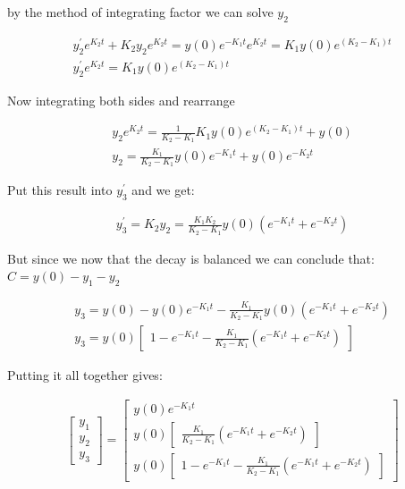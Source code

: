 \documentclass[a4paper]{article}
\begin{document}
by the method of integrating factor we can solve $y_2$

\begin{equation}
\begin{aligned}
y_2^{\prime} e^{K_2t} + K_2y_2e^{K_2t} = y(0) e^{-K_1 t}e^{K_2t} = K_1y(0) e^{(K_2-K_1)t} \\
y_2^{\prime}e^{K_2t} = K_1 y(0)e^{(K_2-K_1)t}
\end{aligned}
\end{equation}

Now integrating both sides and rearrange

\begin{equation}
\begin{aligned}
y_2 e^{K_2t} = \frac{1} {K_2-K_1} K_1 y(0) e^{(K_2-K_1)t} + y(0) \\
y_2 = \frac{K_1} {K_2-K_1} y(0) e^{-K_1t}+ y(0) e^{-K_2t}
\end{aligned}
\end{equation}

Put this result into $y_3^{\prime}$ and we get:

\begin{equation}
\begin{aligned}
y_3^{\prime}  = K_2y_2 = \frac{K_1K_2} {K_2-K_1} y(0) (e^{-K_1t}+ e^{-K_2t})
\end{aligned}
\end{equation}

But since we now that the decay is balanced we can conclude that: \\ $C = y(0) - y_1 - y_2$

\begin{equation}
\begin{aligned}
y_3 = y(0) - y(0) e^{-K_1 t} - \frac{K_1} {K_2-K_1} y(0) (e^{-K_1t}+ e^{-K_2t}) \\
y_3 = y(0) \begin{bmatrix}1- e^{-K_1 t} -  \frac{K_1} {K_2-K_1}(e^{-K_1t} + e^{-K_2t})  \end{bmatrix}
\end{aligned}
\end{equation}

Putting it all together gives: 

\begin{equation}
\begin{aligned}
\begin{bmatrix} y_1 \\ y_2 \\ y_3 \end{bmatrix} = \begin{bmatrix} y(0) e^{-K_1 t}  \\ y(0)\begin{bmatrix} \frac{K_1} {K_2-K_1}(e^{-K_1t}+  e^{-K_2t}) \end{bmatrix}\\ y(0) \begin{bmatrix}1- e^{-K_1 t} -  \frac{K_1} {K_2-K_1}(e^{-K_1t} + e^{-K_2t})  \end{bmatrix}\end{bmatrix}
\end{aligned}
\end{equation}
\end{document}
